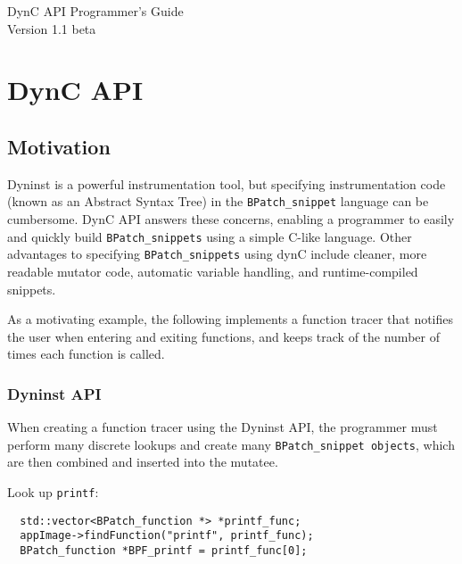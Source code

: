 \documentclass{article}
\begin{document}
\begin{center} \Huge{DynC API Programmer's Guide} \\
\huge{Version 1.1 beta}\\
\vspace{8cm}
\end{center}
\pagebreak
\tableofcontents
\pagebreak

\section{DynC API}
\subsection{Motivation}
Dyninst is a powerful instrumentation tool, but specifying instrumentation code (known as an Abstract Syntax Tree) in the \verb!BPatch_snippet! language can be cumbersome. DynC API answers these concerns, enabling a programmer to easily and quickly build \verb!BPatch_snippets! using a simple C-like language. Other advantages to specifying \verb!BPatch_snippets! using dynC include cleaner, more readable mutator code, automatic variable handling, and runtime-compiled snippets.

As a motivating example, the following implements a function tracer that notifies the user when entering and exiting functions, and keeps track of the number of times each function is called.

\subsubsection{Dyninst API}
When creating a function tracer using the Dyninst API, the programmer must perform many discrete lookups and create many \verb!BPatch_snippet objects!, which are then combined and inserted into the mutatee.

\vspace{0.5cm}


\lstset{basicstyle=\small, showstringspaces=false, stringstyle=\ttfamily}

\noindent Look up \verb!printf!:
\begin{lstlisting}
  std::vector<BPatch_function *> *printf_func;
  appImage->findFunction("printf", printf_func);
  BPatch_function *BPF_printf = printf_func[0];
\end{lstlisting}
\end{document}
